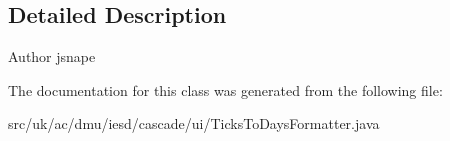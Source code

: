 \subsection{Detailed Description}
\begin{DoxyAuthor}{Author}
jsnape 
\end{DoxyAuthor}


The documentation for this class was generated from the following file\-:\begin{DoxyCompactItemize}
\item 
src/uk/ac/dmu/iesd/cascade/ui/Ticks\-To\-Days\-Formatter.\-java\end{DoxyCompactItemize}
